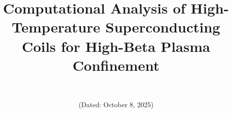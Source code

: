 \documentclass[10pt,twocolumn]{article}
\begin{document}
\title{Computational Analysis of High-Temperature Superconducting Coils for High-Beta Plasma Confinement}

\renewcommand{\thefootnote}{\fnsymbol{footnote}}
\author{\authorname\footnotemark\\\textit{\authoraffiliation}}
\date{(Dated: October 8, 2025)}

\makeatletter
\renewcommand\@makefntext[1]{%
	\noindent\@makefnmark\ \ignorespaces#1%
}
\renewcommand{\footnoterule}{\vspace{1ex}\noindent\hrule width \columnwidth\vspace{1ex}}
\makeatother

\maketitle
\renewcommand{\thefootnote}{\arabic{footnote}}
\sloppy
\end{document}
